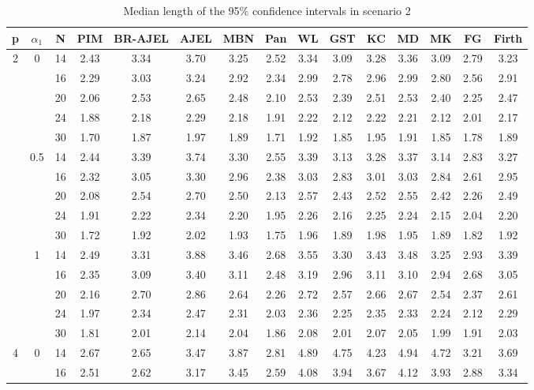 \documentclass[num-refs]{wiley-article}
\begin{document}
\begin{table}
\caption{Median length of the 95$\%$ confidence intervals in scenario 2}
\centering
\scriptsize
\begin{tabular}[t]{ccccccccccccccc}
\hline
p & $\alpha_1$& N & PIM & BR-AJEL & AJEL & MBN & Pan & WL & GST & KC & MD & MK & FG & Firth\\
\hline
2 & 0 & 14 & 2.43 & 3.34 & 3.70 & 3.25 & 2.52 & 3.34 & 3.09 & 3.28 & 3.36 & 3.09 & 2.79 & 3.23\\
& & 16 & 2.29 & 3.03 & 3.24 & 2.92 & 2.34 & 2.99 & 2.78 & 2.96 & 2.99 & 2.80 & 2.56 & 2.91\\
& & 20 & 2.06 & 2.53 & 2.65 & 2.48 & 2.10 & 2.53 & 2.39 & 2.51 & 2.53 & 2.40 & 2.25 & 2.47\\
& & 24 & 1.88 & 2.18 & 2.29 & 2.18 & 1.91 & 2.22 & 2.12 & 2.22 & 2.21 & 2.12 & 2.01 & 2.17\\
&& 30 & 1.70 & 1.87 & 1.97 & 1.89 & 1.71 & 1.92 & 1.85 & 1.95 & 1.91 & 1.85 & 1.78 & 1.89\\
\hline
 & 0.5 & 14 & 2.44 & 3.39 & 3.74 & 3.30 & 2.55 & 3.39 & 3.13 & 3.28 & 3.37 & 3.14 & 2.83 & 3.27\\
&& 16 & 2.32 & 3.05 & 3.30 & 2.96 & 2.38 & 3.03 & 2.83 & 3.01 & 3.03 & 2.84 & 2.61 & 2.95\\
& & 20 & 2.08 & 2.54 & 2.70 & 2.50 & 2.13 & 2.57 & 2.43 & 2.52 & 2.55 & 2.42 & 2.26 & 2.49\\
& & 24 & 1.91 & 2.22 & 2.34 & 2.20 & 1.95 & 2.26 & 2.16 & 2.25 & 2.24 & 2.15 & 2.04 & 2.20\\
&& 30 & 1.72 & 1.92 & 2.02 & 1.93 & 1.75 & 1.96 & 1.89 & 1.98 & 1.95 & 1.89 & 1.82 & 1.92\\
\hline
 & 1 & 14 & 2.49 & 3.31 & 3.88 & 3.46 & 2.68 & 3.55 & 3.30 & 3.43 & 3.48 & 3.25 & 2.93 & 3.39\\
& & 16 & 2.35 & 3.09 & 3.40 & 3.11 & 2.48 & 3.19 & 2.96 & 3.11 & 3.10 & 2.94 & 2.68 & 3.05\\
&& 20 & 2.16 & 2.70 & 2.86 & 2.64 & 2.26 & 2.72 & 2.57 & 2.66 & 2.67 & 2.54 & 2.37 & 2.61\\
&& 24 & 1.97 & 2.34 & 2.47 & 2.31 & 2.03 & 2.36 & 2.25 & 2.35 & 2.33 & 2.24 & 2.12 & 2.29\\
&& 30 & 1.81 & 2.01 & 2.14 & 2.04 & 1.86 & 2.08 & 2.01 & 2.07 & 2.05 & 1.99 & 1.91 & 2.03\\
\hline
4 & 0 & 14 & 2.67 & 2.65 & 3.47 & 3.87 & 2.81 & 4.89 & 4.75 & 4.23 & 4.94 & 4.72 & 3.21 & 3.69\\
& & 16 & 2.51 & 2.62 & 3.17 & 3.45 & 2.59 & 4.08 & 3.94 & 3.67 & 4.12 & 3.93 & 2.88 & 3.34\\

\end{tabular}
\end{table}
\end{document}
